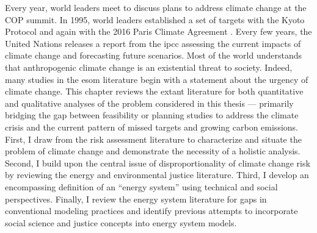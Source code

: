 Every year, world leaders meet to discuss plans to address climate change at the
COP summit. In 1995, world leaders established a set of targets with the Kyoto
Protocol \cite{united_nations_kyoto_1998} and again with the 2016 Paris Climate
Agreement \cite{united_nations_paris_2015}. Every few years, the United Nations
releases a report from the \ac{ipcc} assessing the current impacts of climate
change and forecasting future scenarios. Most of the world understands that
anthropogenic climate change is an existential threat to society. Indeed, many
studies in the \ac{esom} literature begin with a statement about the urgency of
climate change. This chapter reviews the extant literature for both quantitative
and qualitative analyses of the problem considered in this thesis --- primarily
bridging the gap between feasibility or planning studies to address the climate
crisis and the current pattern of missed targets and growing carbon emissions.
First, I draw from the risk assessment literature to characterize and situate
the problem of climate change and demonstrate the necessity of a holistic
analysis. Second, I build upon the central issue of disproportionality of
climate change risk by reviewing the energy and environmental justice
literature. Third, I develop an encompassing definition of an ``energy system''
using technical and social perspectives. Finally, I review the energy system
literature for gaps in conventional modeling practices and identify previous
attempts to incorporate social science and justice concepts into energy system
models.


% 
%  
% 


% 
% 
